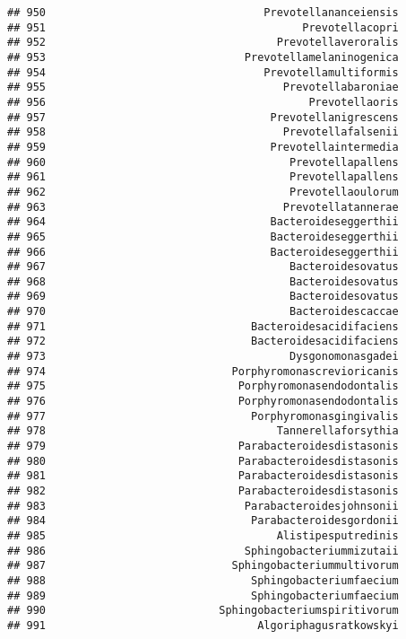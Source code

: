 \documentclass[
]{article}
\begin{document}
\begin{verbatim}
## 950                                  Prevotellananceiensis
## 951                                        Prevotellacopri
## 952                                    Prevotellaveroralis
## 953                               Prevotellamelaninogenica
## 954                                  Prevotellamultiformis
## 955                                     Prevotellabaroniae
## 956                                         Prevotellaoris
## 957                                   Prevotellanigrescens
## 958                                     Prevotellafalsenii
## 959                                   Prevotellaintermedia
## 960                                      Prevotellapallens
## 961                                      Prevotellapallens
## 962                                      Prevotellaoulorum
## 963                                     Prevotellatannerae
## 964                                   Bacteroideseggerthii
## 965                                   Bacteroideseggerthii
## 966                                   Bacteroideseggerthii
## 967                                      Bacteroidesovatus
## 968                                      Bacteroidesovatus
## 969                                      Bacteroidesovatus
## 970                                      Bacteroidescaccae
## 971                                Bacteroidesacidifaciens
## 972                                Bacteroidesacidifaciens
## 973                                      Dysgonomonasgadei
## 974                             Porphyromonascrevioricanis
## 975                              Porphyromonasendodontalis
## 976                              Porphyromonasendodontalis
## 977                                Porphyromonasgingivalis
## 978                                    Tannerellaforsythia
## 979                              Parabacteroidesdistasonis
## 980                              Parabacteroidesdistasonis
## 981                              Parabacteroidesdistasonis
## 982                              Parabacteroidesdistasonis
## 983                               Parabacteroidesjohnsonii
## 984                                Parabacteroidesgordonii
## 985                                    Alistipesputredinis
## 986                               Sphingobacteriummizutaii
## 987                             Sphingobacteriummultivorum
## 988                                Sphingobacteriumfaecium
## 989                                Sphingobacteriumfaecium
## 990                           Sphingobacteriumspiritivorum
## 991                                 Algoriphagusratkowskyi

\end{verbatim}
\end{document}
